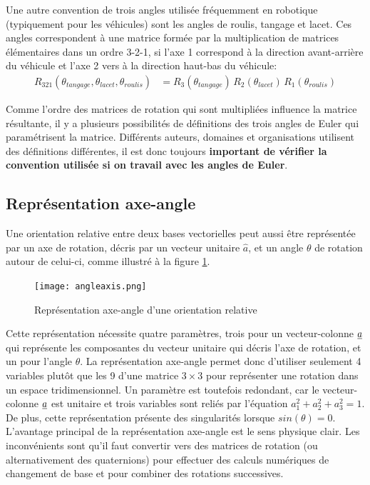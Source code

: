 %
Une autre convention de trois angles utilisée fréquemment en robotique (typiquement pour les véhicules) sont les angles de roulis, tangage et lacet. Ces angles correspondent à une matrice formée par la multiplication de matrices élémentaires dans un ordre 3-2-1, si l'axe 1 correspond à la direction avant-arrière du véhicule et l'axe 2 vers à la direction haut-bas du véhicule: 
\begin{align}
R_{321}(\theta_{tangage}, \theta_{lacet}, \theta_{roulis}) &= R_3( \theta_{tangage} ) \, R_2( \theta_{lacet} ) \, R_1( \theta_{roulis} )
\end{align} 

Comme l'ordre des matrices de rotation qui sont multipliées influence la matrice résultante, il y a plusieurs possibilités de définitions des trois angles de Euler qui paramétrisent la matrice. Différents auteurs, domaines et organisations utilisent des définitions différentes, il est donc toujours \textbf{important de vérifier la convention utilisée si on travail avec les angles de Euler}. 





\subsection{Représentation axe-angle}
\label{sec:rotaxe}
Une orientation relative entre deux bases vectorielles peut aussi être représentée par un axe de rotation, décris par un vecteur unitaire $\hat{a}$, et un angle $\theta$ de rotation autour de celui-ci, comme illustré à la figure \ref{fig:angleaxis}.
\begin{figure}[htbp]
	\centering
		\texttt{[image: angleaxis.png]}
	\caption{Représentation axe-angle d'une orientation relative}
	\label{fig:angleaxis}
\end{figure}

Cette représentation nécessite quatre paramètres, trois pour un vecteur-colonne $\underline{a}$ qui représente les composantes du vecteur unitaire qui décris l'axe de rotation, et un pour l'angle $\theta$. La représentation axe-angle permet donc d'utiliser seulement 4 variables plutôt que les 9 d'une matrice $3\times3$ pour représenter une rotation dans un espace tridimensionnel. Un paramètre est toutefois redondant, car le vecteur-colonne $\underline{a}$ est unitaire et trois variables sont reliés par l'équation $a_{1}^2+a_{2}^2+a_{3}^2=1$. De plus, cette représentation présente des singularités lorsque $sin(\theta)=0$. L'avantage principal de la représentation axe-angle est le sens physique clair. Les inconvénients sont qu'il faut convertir vers des matrices de rotation (ou alternativement des quaternions) pour effectuer des calculs numériques de changement de base et pour combiner des rotations successives.



